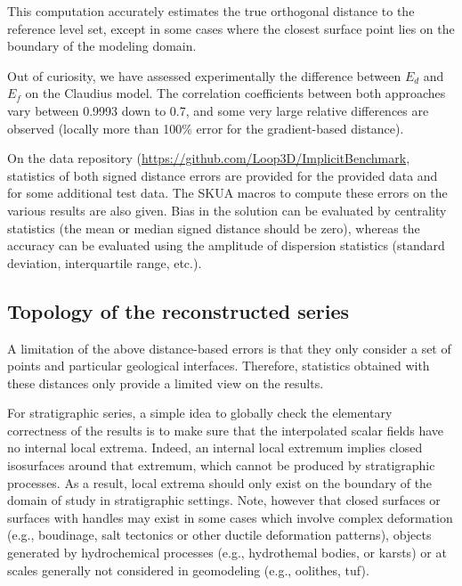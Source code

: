 \documentclass[final]{ring20}
\begin{document}
{This computation accurately estimates the true orthogonal distance to the reference level set, except in some cases where the closest surface point lies on the boundary of the modeling domain.  

Out of curiosity, we have assessed experimentally the difference between $E_d$ and $E_f$ on the Claudius model. The correlation coefficients between both approaches vary between 0.9993 down to 0.7, and some very large relative differences are observed (locally  more than 100\% error for the gradient-based distance). 

On the data repository (\url{https://github.com/Loop3D/ImplicitBenchmark}, statistics of both signed distance errors are provided for the provided data and for some additional test data. The SKUA macros to compute these errors on the various results are also given. Bias in the solution can be evaluated by centrality statistics (the mean or median signed distance should be zero), whereas the accuracy can be evaluated using the amplitude of dispersion statistics (standard deviation, interquartile range, etc.). 


\subsection{Topology of the reconstructed series}

A limitation of the above distance-based errors is that they only consider a set of points and particular geological interfaces. Therefore, statistics obtained with these distances only provide a limited view on the results. 

For stratigraphic series, a simple idea to globally check the elementary correctness of the results is to make sure that the interpolated scalar fields have no internal local extrema. Indeed, an internal local extremum implies closed isosurfaces around that extremum, which cannot be produced by stratigraphic processes. As a result, local extrema should only exist on the boundary of the domain of study in stratigraphic settings. Note, however that closed surfaces or surfaces with handles may exist in some cases which involve complex deformation (e.g., boudinage, salt tectonics or other ductile deformation patterns), objects generated by hydrochemical processes (e.g., hydrothemal bodies, or karsts) or at scales generally not considered in geomodeling (e.g., oolithes, tuf). 

}
\end{document}
